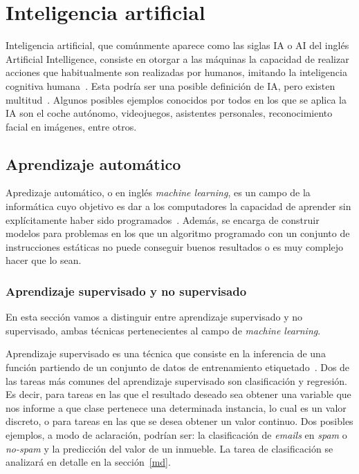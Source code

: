 \section{Inteligencia artificial}

Inteligencia artificial, que comúnmente aparece como las siglas IA o AI del inglés Artificial Intelligence, consiste en otorgar a las máquinas la capacidad de realizar acciones que habitualmente son realizadas por humanos, imitando la inteligencia cognitiva humana~\cite{alanturing:ai}. Esta podría ser una posible definición de IA, pero existen multitud~\cite{russell1995modern}. Algunos posibles ejemplos conocidos por todos en los que se aplica la IA son el coche autónomo, videojuegos, asistentes personales, reconocimiento facial en imágenes, entre otros.

\subsection{Aprendizaje automático}

Apredizaje automático, o en inglés \textit{machine learning}, es un campo de la informática cuyo objetivo es dar a los computadores la capacidad de aprender sin explícitamente haber sido programados~\cite{wiki:machinelearning}. Además, se encarga de construir modelos para problemas en los que un algoritmo programado con un conjunto de instrucciones estáticas no puede conseguir buenos resultados o es muy complejo hacer que lo sean.



\subsubsection{Aprendizaje supervisado y no supervisado}

En esta sección vamos a distinguir entre aprendizaje supervisado y no supervisado, ambas técnicas pertenecientes al campo de \textit{machine learning}.

Aprendizaje supervisado es una técnica que consiste en la inferencia de una función partiendo de un conjunto de datos de entrenamiento etiquetado~\cite{wiki:supervisedLearning}. Dos de las tareas más comunes del aprendizaje supervisado son clasificación y regresión. Es decir, para tareas en las que el resultado deseado sea obtener una variable que nos informe a que clase pertenece una determinada instancia, lo cual es un valor discreto, o para tareas en las que se desea obtener un valor continuo. Dos posibles ejemplos, a modo de aclaración,  podrían ser: la clasificación de \textit{emails} en \textit{spam} o \textit{no-spam} y la predicción del valor de un inmueble. La tarea de clasificación se analizará en detalle en la sección~\ref{md}.

